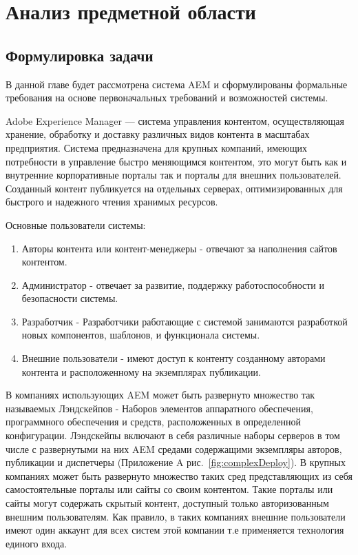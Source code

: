 \chapter{Анализ предметной области}
\label{cha:analysis}
%
%


\section{Формулировка задачи}
В данной главе будет рассмотрена система AEM и сформулированы формальные требования на основе первоначальных требований и возможностей системы.

Adobe Experience Manager — система управления контентом, осуществляющая хранение, обработку и доставку различных видов контента в масштабах предприятия. Система предназначена для крупных компаний, имеющих потребности в управление быстро меняющимся контентом, это могут быть как и внутренние корпоративные порталы так и порталы для внешних пользователей. Созданный контент публикуется на отдельных серверах, оптимизированных для быстрого и надежного чтения хранимых ресурсов.

Основные пользователи системы:
\begin{enumerate}
\item Авторы контента или контент-менеджеры - отвечают за наполнения сайтов контентом.
\item Администратор - отвечает за развитие, поддержку работоспособности и безопасности системы.
\item Разработчик - Разработчики работающие с системой занимаются разработкой новых компонентов, шаблонов, и функционала системы.
\item Внешние пользователи - имеют доступ к контенту созданному авторами контента и расположенному на экземплярах публикации.
\end{enumerate}

В компаниях использующих AEM может быть развернуто множество так называемых Лэндскейпов - Наборов элементов аппаратного обеспечения, программного обеспечения и средств, расположенных в определенной конфигурации. Лэндскейпы включают в себя различные наборы серверов в том числе с развернутыми на них AEM средами содержащими экземпляры авторов, публикации и диспетчеры (Приложение A рис.~\ref{fig:complexDeploy}). В крупных компаниях может быть развернуто множество таких сред представляющих из себя самостоятельные порталы или сайты со своим контентом. Такие порталы или сайты могут содержать скрытый контент, доступный только авторизованным внешним пользователям. Как правило, в таких компаниях внешние пользователи имеют один аккаунт для всех систем этой компании т.е применяется технология единого входа.

